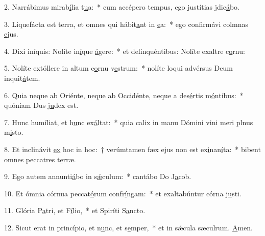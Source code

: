 2. Narrábimus mirab\uline{í}lia t\uline{u}a:~* cum accépero tempus, ego justítias jdic\uline{á}bo.\par 
3. Liquefácta est terra, et omnes qui hábit\uline{a}nt in \uline{e}a:~* ego confirmávi colmnas \uline{e}jus.\par 
4. Dixi iníquis: Nolíte in\uline{í}que \uline{á}gere:~* et delinquéntibus: Nolíte exaltre c\uline{o}rnu:\par 
5. Nolíte extóllere in altum c\uline{o}rnu v\uline{e}strum:~* nolíte loqui advérsus Deum inquit\uline{á}tem.\par 
6. Quia neque ab Oriénte, neque ab Occidénte, neque a des\uline{é}rtis m\uline{ó}ntibus:~* quóniam Dus j\uline{u}dex est.\par 
7. Hunc humíliat, et h\uline{u}nc ex\uline{á}ltat:~* quia calix in manu Dómini vini meri plnus m\uline{i}sto.\par 
8. Et inclinávit \uline{ex} hoc in hoc:~† verúmtamen fæx ejus non est ex\uline{i}nan\uline{í}ta:~* bibent omnes peccatres t\uline{e}rræ.\par 
9. Ego autem annunti\uline{á}bo in s\uline{ǽ}culum:~* cantábo Do J\uline{a}cob.\par 
10. Et ómnia córnua peccat\uline{ó}rum confr\uline{í}ngam:~* et exaltabúntur córna j\uline{u}sti.\par 
11. Glória P\uline{a}tri, et F\uline{í}lio,~* et Spiríti S\uline{a}ncto.\par 
12. Sicut erat in princípio, et n\uline{u}nc, et s\uline{e}mper,~* et in sǽcula sæculrum. \uline{A}men.\par 
